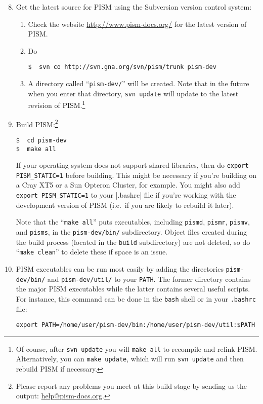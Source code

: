 \documentclass[11pt,final]{amsart}
\renewcommand{\t}[1]{\texttt{#1}}
\begin{document}
\begin{enumerate}\setcounter{enumi}{7}
\item Get the latest source for PISM using the Subversion version control system:
\begin{enumerate}
\item \label{getPISMstep} Check the website \url{http://www.pism-docs.org/} for the latest version of PISM.
\item Do
\begin{verbatim}
$  svn co http://svn.gna.org/svn/pism/trunk pism-dev
\end{verbatim}
\item A directory called ``\verb|pism-dev/|'' will be created.  Note that in the future when you enter that directory, \verb|svn update| will update to the latest revision of PISM.\footnote{Of course, after \t{svn update} you will \t{make all} to recompile and relink PISM. Alternatively, you can \t{make update}, which will run \t{svn update} and then rebuild PISM if necessary.}
\end{enumerate}

\item Build PISM:\footnote{Please report any problems you meet at this build stage by sending us the output: \href{mailto:help@pism-docs.org}{help@pism-docs.org}.}
\begin{verbatim}
$  cd pism-dev
$  make all
\end{verbatim}

If your operating system does not support shared libraries, then do \verb|export PISM_STATIC=1| before building.  This might be necessary if you're building on a Cray XT5 or a Sun Opteron Cluster, for example.  You might also add \verb|export PISM_STATIC=1| to your |.bashrc| file if you're working with the development version of PISM (i.e.~if you are likely to rebuild it
later).

Note that the ``\verb|make all|'' puts executables, including \verb|pismd|, \verb|pismr|, \verb|pismv|, and \verb|pisms|, in the \verb|pism-dev/bin/| subdirectory.  Object files created during the build process (located in the \verb|build| subdirectory) are not deleted, so do ``\verb|make clean|'' to delete these if space is an issue.

\item PISM executables can be run most easily by adding the directories \verb|pism-dev/bin/| and \verb|pism-dev/util/| to your \verb|PATH|.  The former directory contains the major PISM executables while the latter contains several useful scripts.  For instance, this command can be done in the \verb|bash| shell or in your \verb|.bashrc| file:
\begin{verbatim}
export PATH=/home/user/pism-dev/bin:/home/user/pism-dev/util:$PATH
\end{verbatim}
\end{enumerate}
\end{document}
